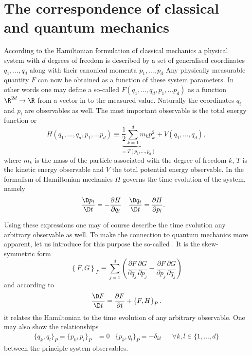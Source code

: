 \section{The correspondence of classical and quantum mechanics}
According to the Hamiltonian formulation of classical mechanics
a physical system with $d$ degrees of freedom
is described by a set of generalised coordinates
$q_1, \ldots, q_d$ along with their canonical momenta $p_1, \ldots, p_d$
Any physically measurable quantity $F$
can now be obtained as a function of these system parameters.
In other words one may define a so-called 
\newcommand{\clphase}{(q_1, \ldots, q_d, p_1, \ldots p_d)}
$F\clphase$ as a function $\R^{2d} \to \R$
from a vector in  to the measured value.
Naturally the coordinates $q_i$ and $p_i$ are observables as well.
The most important observable is the total energy function or 
\begin{equation}
	H\clphase
	\equiv \underbrace{\frac{1}{2} \sum_{k=1}^d m_k p_k^2}_{= T(p_1, \ldots, p_d)}
	+ V(q_1, \ldots, q_d),
	\label{eqn:HamiltonianClassical}
\end{equation}
where $m_k$ is the mass of the particle associated with
the degree of freedom $k$,
$T$ is the kinetic energy observable and $V$ the total potential energy observable.
In the formalism of Hamiltonian mechanics $H$ governs the time evolution
of the system, namely
\begin{align}
	\frac{\D p_i}{\D t} &= - \frac{\partial H}{\partial q_i} &
	\frac{\D q_i}{\D t} &= \frac{\partial H}{\partial p_i}.
	\label{eqn:HamiltonianEqnMotion}
\end{align}

Using these expressions one may of course describe the time evolution
any arbitrary observable as well.
To make the connection to quantum mechanics more apparent,
let us introduce for this purpose the so-called .
It is the skew-symmetric form
\begin{equation}
	\left\{ F, G \right\}_P \equiv \sum_{j=1}^d \left(
	\frac{\partial  F}{\partial q_j} \frac{\partial G}{\partial p_j}
	- \frac{\partial  F}{\partial p_j} \frac{\partial G}{\partial q_j}
	\right)
	\label{eqn:PoissonBracket}
\end{equation}
and according to
\begin{equation}
	\frac{\D F}{\D t} = \frac{\partial F}{\partial t} + \left\{ F, H \right\}_P.
	\label{eqn:PoissonTimeEvolution}
\end{equation}
it relates the Hamiltonian to the time evolution of any arbitrary observable.
One may also show the relationships
\begin{align}
	\{ q_k, q_l \}_P = \{p_k, p_l\}_P &= 0 & \{ p_k, q_l\}_P = - \delta_{kl} &&\forall k,l \in \{1, \ldots, d\}
	\label{eqn:PoissonProperties}
\end{align}
between the principle system observables.

